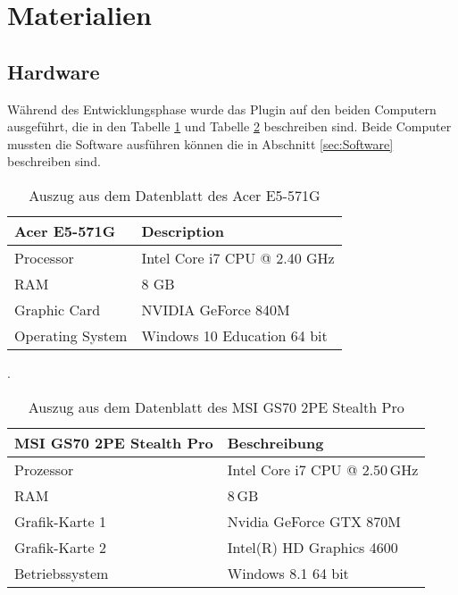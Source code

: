 
\section{Materialien}\label{sec:Materials}

\subsection{Hardware}\label{sec:Hardware}

Während des Entwicklungsphase wurde das Plugin auf den beiden Computern ausgeführt, die in den Tabelle \ref{tab:Computer1} und Tabelle \ref{tab:Computer2} beschreiben sind. Beide Computer mussten die Software ausführen können die in Abschnitt \ref{sec:Software} beschreiben sind.

\begin{table}[H]
	\centering
	\begin{tabular}{|l|l|}
		\hline
		\Absatzbox{}
		\textbf{Acer E5-571G}& \textbf{Description} \\
		\hline
		Processor & Intel Core i7 CPU @ 2.40 GHz\\
		\hline
		RAM & 8 GB  \\
		\hline 
		Graphic Card & NVIDIA GeForce 840M\\
		\hline
		Operating System &  Windows 10 Education 64 bit   \\
		\hline
	\end{tabular}
	\caption[Auszug aus dem Datenblatt des Acer E5-571G]{Auszug aus dem Datenblatt des Acer E5-571G}.
	\label{tab:Computer1}
\end{table}

\begin{table}[H]
	\centering
	\begin{tabular}{|l|l|}
		\hline
		\Absatzbox{}
		\textbf{MSI GS70 2PE Stealth Pro}& \textbf{Beschreibung} \\
		\hline
		Prozessor & Intel Core i7 CPU @ $2.50\,$GHz \\
		\hline
		RAM & $8\,$GB \\
		\hline 
		Grafik-Karte 1 & Nvidia GeForce GTX 870M\\
		\hline
		Grafik-Karte 2 & Intel(R) HD Graphics 4600\\
		\hline
		Betriebssystem & Windows 8.1 64 bit \\
		\hline
	\end{tabular}
	\caption[Auszug aus dem Datenblatt des MSI GS70 2PE Stealth Pro]{Auszug aus dem Datenblatt des MSI GS70 2PE Stealth Pro}
	\label{tab:Computer2}
\end{table}

